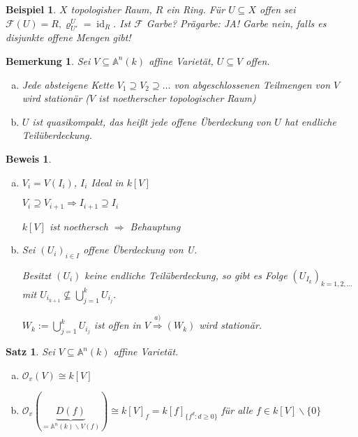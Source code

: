 \documentclass[a4paper, 12pt, numbers=noendperiod, chapterprefix=true, headsepline]{scrbook}
\theoremstyle{break}
\newtheorem{Satz}{Satz}
\newtheorem{Bem}[Def]{Bemerkung}
\theoremstyle{nonumberbreak}
\newtheorem{nnBsp}{Beispiel}
\newtheorem{Bew}{Beweis}
\theoremstyle{nonumberplain}
\newcommand{\quot}[1]{\textrm{\glqq}{#1}\textrm{\grqq}}
\DeclareMathOperator{\id}{id}
\newcommand{\A}{\mathbb{A}}
\newcommand{\calF}{\mathcal{F}}
\newcommand{\calO}{\mathcal{O}}
\begin{document}
\begin{nnBsp}
$X$ topologisher Raum, $R$ ein Ring. F\"ur $U\subseteq X$ offen sei $\calF(U)=R, \varrho^U_{U'}=\id_R$. Ist $\calF$ Garbe? Pr\"agarbe: JA! Garbe nein, falls es disjunkte offene Mengen gibt!
\end{nnBsp}

\begin{Bem}\label{7.5}\label{bem7.5}
Sei $V\subseteq \A^n(k)$ affine Variet\"at, $U\subseteq V$ offen.\begin{enumerate}[a)]
\item
	Jede absteigene Kette $V_1 \supseteq V_2 \supseteq \dots $ von abgeschlossenen Teilmengen von $V$ wird station\"ar (\quot{$V$ ist noetherscher topologischer Raum})
	
\item
	$U$ ist quasikompakt, das hei\ss t jede offene \"Uberdeckung von $U$ hat endliche Teil\"uberdeckung.
\end{enumerate}\end{Bem}

\begin{Bew}\begin{enumerate}[a)]
\item
$V_i=V(I_i)$, $I_i$ Ideal in $k[V]$

$V_i\supseteq V_{i+1} \Rightarrow I_{i+1} \supseteq I_i$

$k[V]$ ist noethersch $\Rightarrow $ Behauptung

\item\label{bem7.5b}
Sei $(U_i)_{i\in I}$ offene \"Uberdeckung von U.

Besitzt $(U_i)$ keine endliche Teil\"uberdeckung, so gibt es Folge $(U_{I_k})_{k=1,2,\dots }$ mit $U_{i_{k+1}} \nsubseteq \bigcup_{j=1}^k U_{i_j}.$

$W_k:= \bigcup_{j=1}^k U_{i_j}$ ist offen in $V \stackrel{a)}{\Rightarrow} (W_k)$ wird station\"ar.
\end{enumerate}\end{Bew}

\begin{Satz}\label{satz5}
Sei $V\subseteq\A^n(k)$ affine Variet\"at.\begin{enumerate}[a)]
\item\label{satz5a}
	$\calO_v(V) \cong k[V]$

\item\label{satz5b}
	$\calO_v(\underbrace{D(f)}_{=\A^n(k)\backslash V(f)}) \cong k[V]_f = k[f]_{\{f^d:d\ge 0\}}$
	f\"ur alle $f\in k[V]\backslash\{0\}$
\end{enumerate}\end{Satz}
\end{document}
